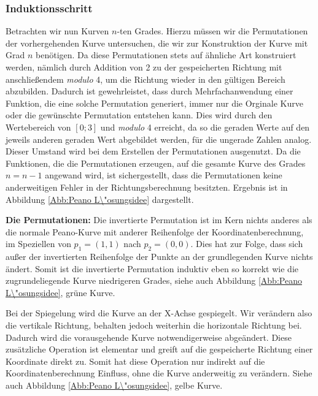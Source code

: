 \documentclass[course=asp]{aspdoc}
\begin{document}
\subsubsection{Induktionsschritt} \label{Induktionsschritt}
Betrachten wir nun Kurven $n$-ten Grades. Hierzu m\"ussen wir die Permutationen der vorhergehenden Kurve untersuchen, die wir zur Konstruktion der Kurve mit Grad $n$ ben\"otigen.
Da diese Permutationen stets auf \"ahnliche Art konstruiert werden, n\"amlich durch Addition von 2 zu der gespeicherten Richtung mit anschlie\ss endem \textit{modulo} 4, um die Richtung wieder in den g\"ultigen Bereich abzubilden. Dadurch ist gewehrleistet, dass durch Mehrfachanwendung einer Funktion, die eine solche Permutation generiert, immer nur die Orginale Kurve oder die gew\"unschte Permutation entstehen kann. Dies wird durch den Wertebereich von $[0;3]$ und \textit{modulo} 4 erreicht, da so die geraden Werte auf den jeweils anderen geraden Wert abgebildet werden, f\"ur die ungerade Zahlen analog. Dieser Umstand wird bei dem Erstellen der Permutationen ausgenutzt.
Da die Funktionen, die die Permutationen erzeugen, auf die gesamte Kurve des Grades $n = n - 1$ angewand wird, ist sichergestellt, dass die Permutationen keine anderweitigen Fehler in der Richtungsberechnung besitzten. Ergebnis ist in Abbildung \ref{Abb:Peano L\"osungsidee} dargestellt.

\textbf{Die Permutationen: }%
Die invertierte Permutation ist im Kern nichts anderes als die normale Peano-Kurve mit anderer Reihenfolge der Koordinatenberechnung, im Speziellen von $p_1=(1,1)$ nach $p_2 = (0,0)$. Dies hat zur Folge, dass sich au\ss er der invertierten Reihenfolge der Punkte an der grundlegenden Kurve nichts \"andert. Somit ist die invertierte Permutation induktiv eben so korrekt wie die zugrundeliegende Kurve niedrigeren Grades, siehe auch Abbildung \ref{Abb:Peano L\"osungsidee}, gr\"une Kurve.

Bei der Spiegelung wird die Kurve an der X-Achse gespiegelt. Wir ver\"andern also die vertikale Richtung, behalten jedoch weiterhin die horizontale Richtung bei. Dadurch wird die vorausgehende Kurve notwendigerweise abge\"andert. Diese zus\"atzliche Operation ist elementar und greift auf die gespeicherte Richtung einer Koordinate direkt zu. Somit hat diese Operation nur indirekt auf die Koordinatenberechnung Einfluss, ohne die Kurve anderweitig zu ver\"andern. Siehe auch Abbildung \ref{Abb:Peano L\"osungsidee}, gelbe Kurve. %
\end{document}
